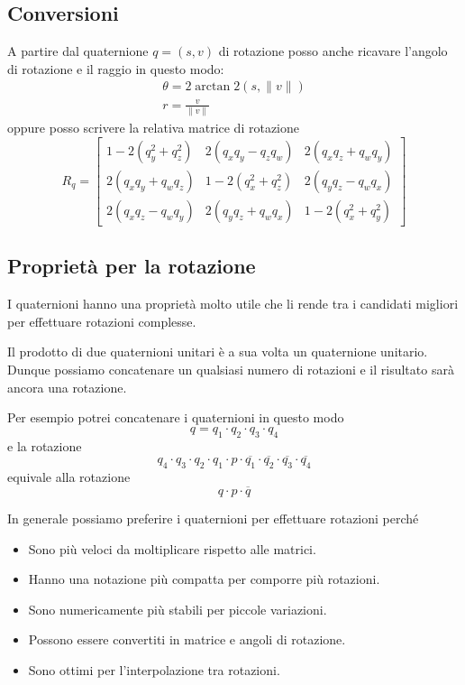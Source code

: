 \subsection{Conversioni}
A partire dal quaternione $q = (s, v)$ di rotazione posso anche ricavare l'angolo di rotazione e il raggio in questo modo:
\begin{gather*}
	\theta = 2 \arctan 2 (s, \| v \|) \\
	r = \frac{v}{\| v \|}
\end{gather*}
oppure posso scrivere la relativa matrice di rotazione
\[
	R_q = \begin{bmatrix}
		1 - 2 (q_y^2 + q_z^2) & 2 (q_x q_y - q_z q_w) & 2 (q_x q_z + q_w q_y) \\
		2 (q_x q_y + q_w q_z) & 1 - 2 (q_x^2 + q_z^2) & 2 (q_y q_z - q_w q_x) \\
		2 (q_x q_z - q_w q_y) & 2 (q_y q_z + q_w q_x) & 1 - 2 (q_x^2 + q_y^2)
	\end{bmatrix}
\]

\subsection{Propriet\`a per la rotazione}
I quaternioni hanno una propriet\`a molto utile che li rende tra i candidati migliori per effettuare rotazioni complesse.

Il prodotto di due quaternioni unitari \`e a sua volta un quaternione unitario. Dunque possiamo
concatenare un qualsiasi numero di rotazioni e il risultato sar\`a ancora una rotazione.

Per esempio potrei concatenare i quaternioni in questo modo
\[ q = q_1 \cdot q_2 \cdot q_3 \cdot q_4 \]
e la rotazione
\[
	q_4 \cdot q_3 \cdot q_2 \cdot q_1 \cdot p \cdot
	\overline{q_1} \cdot \overline{q_2} \cdot \overline{q_3} \cdot \overline{q_4}
\]
equivale alla rotazione
\[ q \cdot p \cdot \overline{q} \]

In generale possiamo preferire i quaternioni per effettuare rotazioni perch\'e
\begin{itemize}
	\item Sono pi\`u veloci da moltiplicare rispetto alle matrici.
	\item Hanno una notazione pi\`u compatta per comporre pi\`u rotazioni.
	\item Sono numericamente pi\`u stabili per piccole variazioni.
	\item Possono essere convertiti in matrice e angoli di rotazione.
	\item Sono ottimi per l'interpolazione tra rotazioni.
\end{itemize}


